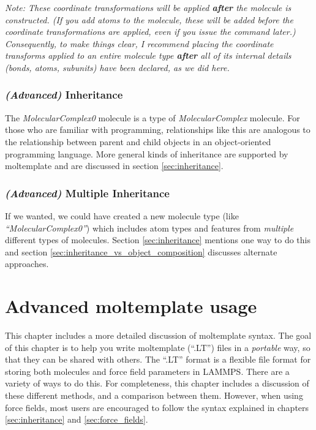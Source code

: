 \documentclass[11pt]{article}
\begin{document}
\textit{Note: These coordinate transformations will be 
applied \textbf{after} the molecule is constructed.
(If you add atoms to the molecule, these will be added before
the coordinate transformations are applied,
even if you issue the command later.)
Consequently, to make things clear, 
I recommend placing the coordinate transforms applied to 
an entire molecule type \textbf{after} all of its internal details 
(bonds, atoms, subunits) have been declared, as we did here.}

\subsubsection*{\textit{(Advanced)} Inheritance}
\label{sec:inheritance_intro}
The \textit{MolecularComplex0} molecule is a type of \textit{MolecularComplex} molecule.
For those who are familiar with programming, 
relationships like this are analogous to the relationship 
between parent and child objects in an object-oriented programming language.
More general kinds of inheritance are supported by moltemplate
and are discussed in section \ref{sec:inheritance}.

\subsubsection*{\textit{(Advanced)} Multiple Inheritance}
If we wanted, we could have created a new molecule type 
(like \textit{``MolecularComplex0''}) 
which includes atom types and features from 
\textit{multiple} different types of molecules.
Section \ref{sec:inheritance} mentions one way to do this
and section \ref{sec:inheritance_vs_object_composition}
discusses alternate approaches.









\section{Advanced moltemplate usage}
\label{sec:advanced_usage}
This chapter includes a more detailed discussion of moltemplate syntax.
The goal of this chapter is to help you write moltemplate (``.LT'') files
in a \textit{portable} way, so that they can be shared with others.
The ``.LT'' format is a flexible file format for storing both
molecules and force field parameters in LAMMPS.
There are a variety of ways to do this.
For completeness, this chapter includes a discussion of these
different methods, and a comparison between them.
However, when using force fields, most users are encouraged to
follow the syntax explained in chapters
\ref{sec:inheritance} and \ref{sec:force_fields}.
\end{document}
